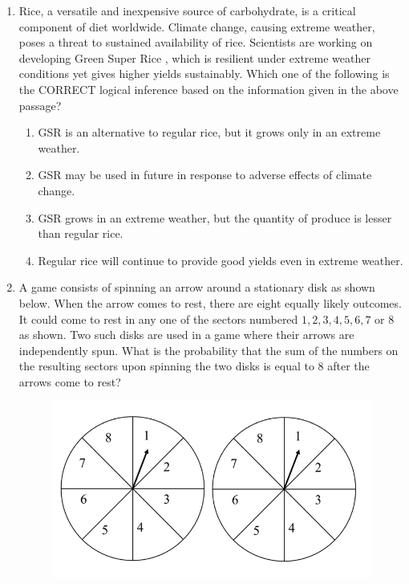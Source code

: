 \documentclass[journal,12pt,onecolumn]{IEEEtran}
\theoremstyle{remark}
\begin{document}
\begin{enumerate}
    \hfill{}
    \begin{enumerate}
    \end{enumerate}

    \item Rice, a versatile and inexpensive source of carbohydrate, is a critical component of diet worldwide. Climate change, causing extreme weather, poses a threat to sustained availability of rice. Scientists are working on developing Green Super Rice , which is resilient under extreme weather conditions yet gives higher yields sustainably. Which one of the following is the CORRECT logical inference based on the information given in the above passage?

    \hfill{}
    \begin{enumerate}
        \item GSR is an alternative to regular rice, but it grows only in an extreme weather.
        \item GSR may be used in future in response to adverse effects of climate change.
        \item GSR grows in an extreme weather, but the quantity of produce is lesser than regular rice.
        \item Regular rice will continue to provide good yields even in extreme weather.
    \end{enumerate}

    \item A game consists of spinning an arrow around a stationary disk as shown below. When the arrow comes to rest, there are eight equally likely outcomes. It could come to rest in any one of the sectors numbered $1, 2, 3, 4, 5, 6, 7$ or $8$ as shown. Two such disks are used in a game where their arrows are independently spun. What is the probability that the sum of the numbers on the resulting sectors upon spinning the two disks is equal to $8$ after the arrows come to rest?
    \begin{figure}[h]
        \centering
        \includegraphics[width=0.4\columnwidth]{q7.png}
        \caption*{}
        \label{fig:q7}
    \end{figure}


\end{enumerate}
\end{document}
